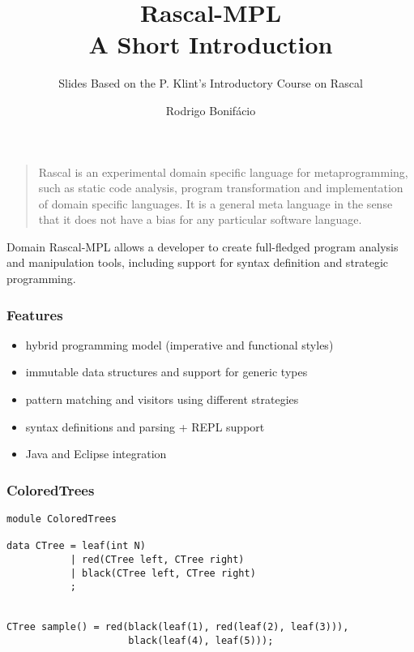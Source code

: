 \documentclass{beamer}
\title{Rascal-MPL \\ A Short Introduction}
\subtitle{Slides Based on the P. Klint's Introductory Course on Rascal}
\author{Rodrigo Bonif\'{a}cio}
\begin{document}
\begin{frame}
\titlepage
\end{frame}

\begin{frame}
  \begin{quote}
Rascal is an experimental domain specific language for metaprogramming, such as static code analysis, program transformation and implementation of domain specific languages. It is a general meta language in the sense that it does not have a bias for any particular software language.
  \end{quote}
\end{frame}

\begin{frame}
  \begin{block}{Domain}
    Rascal-MPL allows a developer
    to create full-fledged program
    analysis and manipulation tools,
    including support for syntax
    definition and strategic programming. 
  \end{block}
\end{frame}

\begin{frame}
  \frametitle{Features}

  \begin{itemize}
    \item hybrid programming model (imperative and functional styles)
    \item immutable data structures and support for generic types
    \item pattern matching and visitors using different strategies
    \item syntax definitions and parsing + REPL support  
    \item Java and Eclipse integration  
  \end{itemize}  
\end{frame}

\begin{frame}[fragile]
  \frametitle{ColoredTrees}

  \begin{small}
  \begin{lstlisting}[language=Rascal]
module ColoredTrees

data CTree = leaf(int N)
           | red(CTree left, CTree right)
           | black(CTree left, CTree right)
           ;


CTree sample() = red(black(leaf(1), red(leaf(2), leaf(3))),
                     black(leaf(4), leaf(5))); 
\end{lstlisting}
  \end{small}
\end{frame}
\end{document}
